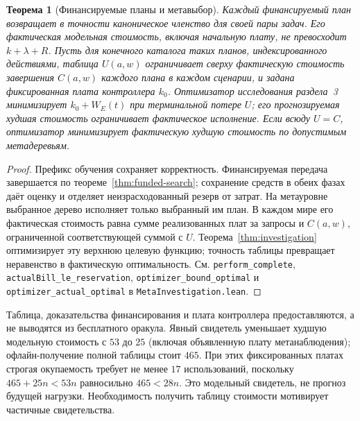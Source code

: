 \documentclass[10pt,a4paper]{article}
\newtheorem{theorem}{Теорема}[section]
\newcommand{\rc}[1]{\allowbreak\texttt{#1}\allowbreak}
\begin{document}
\begin{theorem}[Финансируемые планы и метавыбор]\label{thm:meta-selection}
Каждый финансируемый план возвращает в точности каноническое членство для своей пары задач. Его фактическая модельная стоимость, включая начальную плату, не превосходит $k+\lambda+R$. Пусть для конечного каталога таких планов, индексированного действиями, таблица $U(a,w)$ ограничивает сверху фактическую стоимость завершения $C(a,w)$ каждого плана в каждом сценарии, и задана фиксированная плата контроллера $k_0$. Оптимизатор исследования раздела~3 минимизирует $k_0+W_E(t)$ при терминальной потере $U$; его прогнозируемая худшая стоимость ограничивает фактическое исполнение. Если всюду $U=C$, оптимизатор минимизирует фактическую худшую стоимость по допустимым метадеревьям.
\end{theorem}
\begin{proof}
Префикс обучения сохраняет корректность. Финансируемая передача завершается по теореме~\ref{thm:funded-search}; сохранение средств в обеих фазах даёт оценку и отделяет неизрасходованный резерв от затрат. На метауровне выбранное дерево исполняет только выбранный им план. В каждом мире его фактическая стоимость равна сумме реализованных плат за запросы и $C(a,w)$, ограниченной соответствующей суммой с $U$. Теорема~\ref{thm:investigation} оптимизирует эту верхнюю целевую функцию; точность таблицы превращает неравенство в фактическую оптимальность. См. \rc{perform\_complete}, \rc{actualBill\_le\_reservation}, \rc{optimizer\_bound\_optimal} и \rc{optimizer\_actual\_optimal} в \rc{MetaInvestigation.lean}.
\end{proof}
Таблица, доказательства финансирования и плата контроллера предоставляются, а не выводятся из бесплатного оракула. Явный свидетель уменьшает худшую модельную стоимость с $53$ до $25$ (включая объявленную плату метанаблюдения); офлайн-получение полной таблицы стоит $465$. При этих фиксированных платах строгая окупаемость требует не менее $17$ использований, поскольку $465+25n<53n$ равносильно $465<28n$. Это модельный свидетель, не прогноз будущей нагрузки. Необходимость получить таблицу стоимости мотивирует частичные свидетельства.
\end{document}
